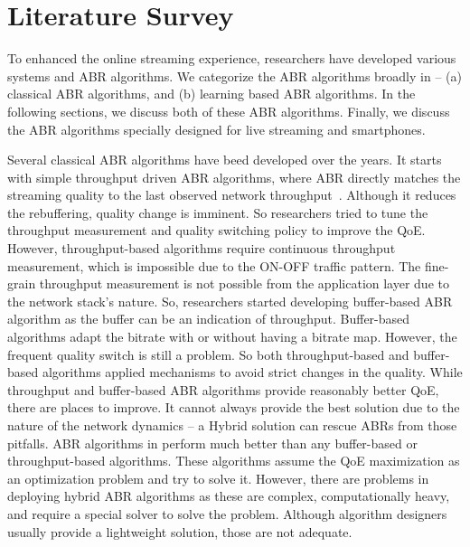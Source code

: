\section{Literature Survey}
To enhanced the online streaming experience, researchers have developed various systems and ABR algorithms. We categorize the ABR algorithms broadly in -- (a) classical ABR algorithms, and (b) learning based ABR algorithms. In the following sections, we discuss both of these ABR algorithms. Finally, we discuss the ABR algorithms specially designed for live streaming and smartphones.

Several classical ABR algorithms have beed developed over the years. It starts with simple throughput driven ABR algorithms, where ABR directly matches the streaming quality to the last observed network throughput~\cite{5677508,10.1145/1943552.1943575,10.1145/1943552.1943574}. Although it reduces the rebuffering, quality change is imminent. So researchers tried to tune the throughput measurement and quality switching policy to improve the QoE. However, throughput-based algorithms require continuous throughput measurement, which is impossible due to the ON-OFF traffic pattern. The fine-grain throughput measurement is not possible from the application layer due to the network stack's nature. So, researchers started developing buffer-based ABR algorithm as the buffer can be an indication of throughput. Buffer-based algorithms adapt the bitrate with or without having a bitrate map. However, the frequent quality switch is still a problem. So both throughput-based and buffer-based algorithms applied mechanisms to avoid strict changes in the quality. While throughput and buffer-based ABR algorithms provide reasonably better QoE, there are places to improve. It cannot always provide the best solution due to the nature of the network dynamics -- a Hybrid solution can rescue ABRs from those pitfalls. ABR algorithms in \cite{7247436,140405,yin2015control,10.1145/2670518.2673877} perform much better than any buffer-based or throughput-based algorithms. These algorithms assume the QoE maximization as an optimization problem and try to solve it. However, there are problems in deploying hybrid ABR algorithms as these are complex, computationally heavy, and require a special solver to solve the problem. Although algorithm designers usually provide a lightweight solution, those are not adequate.

